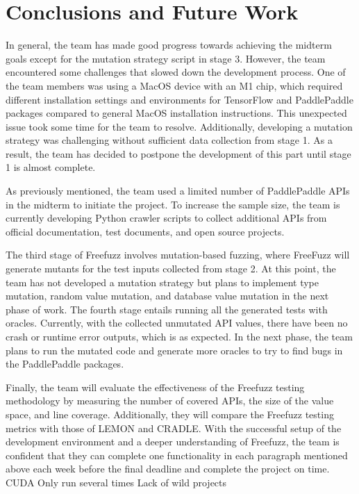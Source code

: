 \documentclass[sigconf]{acmart}
\begin{document}
\section{Conclusions and Future Work}
In general, the team has made good progress towards achieving the midterm goals except for the mutation strategy script in stage 3. However, the team encountered some challenges that slowed down the development process. One of the team members was using a MacOS device with an M1 chip, which required different installation settings and environments for TensorFlow and PaddlePaddle packages compared to general MacOS installation instructions. This unexpected issue took some time for the team to resolve. Additionally, developing a mutation strategy was challenging without sufficient data collection from stage 1. As a result, the team has decided to postpone the development of this part until stage 1 is almost complete.
\par As previously mentioned, the team used a limited number of PaddlePaddle APIs in the midterm to initiate the project. To increase the sample size, the team is currently developing Python crawler scripts to collect additional APIs from official documentation, test documents, and open source projects.
\par The third stage of Freefuzz involves mutation-based fuzzing, where FreeFuzz will generate mutants for the test inputs collected from stage 2. At this point, the team has not developed a mutation strategy but plans to implement type mutation, random value mutation, and database value mutation in the next phase of work. The fourth stage entails running all the generated tests with oracles. Currently, with the collected unmutated API values, there have been no crash or runtime error outputs, which is as expected. In the next phase, the team plans to run the mutated code and generate more oracles to try to find bugs in the PaddlePaddle packages.
\par Finally, the team will evaluate the effectiveness of the Freefuzz testing methodology by measuring the number of covered APIs, the size of the value space, and line coverage. Additionally, they will compare the Freefuzz testing metrics with those of LEMON and CRADLE.
With the successful setup of the development environment and a deeper understanding of Freefuzz, the team is confident that they can complete one functionality in each paragraph mentioned above each week before the final deadline and complete the project on time.
CUDA
Only run several times
Lack of wild projects
\end{document}
